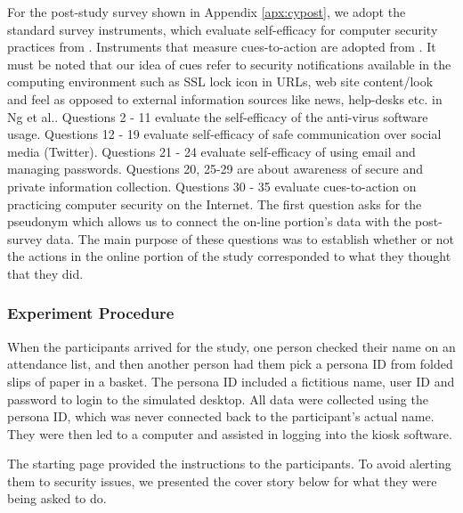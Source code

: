 For the post-study survey shown in Appendix \ref{apx:cypost}, we adopt the standard survey instruments, which evaluate self-efficacy for computer security practices from \cite{ng2007, compeau1995}. Instruments that measure cues-to-action are adopted from \cite{ng2007}. It must be noted that our idea of cues refer to security notifications available in the computing environment such as SSL lock icon in URLs, web site content/look and feel as opposed to external information sources like news, help-desks etc. in Ng et al.\cite{ng2007}. Questions 2 - 11 evaluate the self-efficacy of the anti-virus software usage. Questions 12 - 19 evaluate self-efficacy of safe communication over social media (Twitter). Questions 21 - 24 evaluate self-efficacy of using email and managing passwords. Questions 20, 25-29 are about awareness of secure and private information collection. Questions 30 - 35 evaluate cues-to-action on practicing computer security on the Internet. The first question asks for the pseudonym which allows us to connect the on-line portion's data with the post-survey data. The main purpose of these questions was to establish whether or not the actions in the online portion of the study corresponded to what they thought that they did.


\subsubsection*{Experiment Procedure}
When the participants arrived for the study, one person checked their name on an attendance list, and then another person had them pick a persona ID from folded slips of paper in a basket. The persona ID included a fictitious name, user ID and password to login to the simulated desktop. All data were collected using the persona ID, which was never connected back to the participant's actual name. They were then led to a computer and assisted in logging into the kiosk software.

The starting page provided the instructions to the participants. To avoid alerting them to security issues, we presented the cover story below for what they were being asked to do.

